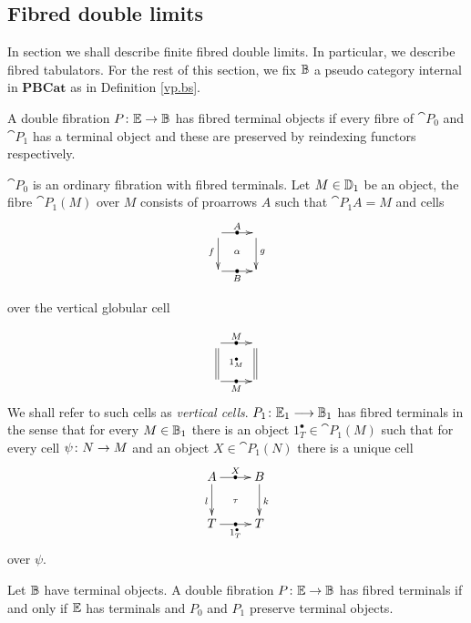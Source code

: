\documentclass[9pt, leqno]{amsart}
\begin{document}
\subsection{Fibred double limits}
In section we shall describe finite fibred double limits. In particular, we describe fibred tabulators. 
For the rest of this section, we fix $\mathbb{B}$ a pseudo category internal in $\mathbf{PBCat}$ as in Definition \ref{vp.bs}. 

\begin{defn}
	A double fibration $P \colon \mathbb{E} \to \mathbb{B}$ has fibred terminal objects if every fibre of $\cat{P}_0$ and $\cat{P}_1$ has a terminal object and these are preserved by reindexing functors respectively. 
\end{defn}

$\cat{P}_0$ is an ordinary fibration with fibred terminals. Let $M \in \mathbb{D}_1$ be an object, the fibre $\cat{P}_1(M)$ over $M$ consists of proarrows $A$ such that $\cat{P}_1{A} = M$ and cells 
\begin{equation*}
	\xymatrix{
		{} \ar[r]|-{\bullet}^{A} \ar[d]_{f} \ar@{}[dr]|{\alpha} & {} \ar[d]^{g} \\
		{} \ar[r]|-{\bullet}_{B} & {}
	}
\end{equation*}

over the vertical globular cell

\begin{equation*}
	\xymatrix{
		{} \ar[r]|-{\bullet}^M \ar@{=}[d] \ar@{}[dr]|{\ipro{M}} & {} \ar@{=}[d] \\
		{} \ar[r]|-{\bullet}_M & {}
	}
\end{equation*}
We shall refer to such cells as \emph{vertical cells}. ${P}_{1} \colon \mathbb{E}_{1} \longrightarrow \mathbb{B}_{1}$ has fibred terminals in the sense that for every $M \in \mathbb{B}_1$ there is an object $1^{\bullet}_T \in \cat{P}_1(M)$ such that for every cell $\psi \colon N \to M$ and an object $X \in \cat{P}_1(N)$ there is a unique cell
\begin{equation*}
	\xymatrix{
		A \ar[r]|-{\bullet}^{X} \ar[d]_{l} \ar@{}[dr]|{\tau} & B \ar[d]^{k} \\
		T \ar[r]|-{\bullet}_{1^{\bullet}_T} & T
	}
\end{equation*}
over $\psi$.

\begin{lemma}
	Let $\mathbb{B}$ have terminal objects. A double fibration $P \colon \mathbb{E} \to \mathbb{B}$ has fibred terminals if and only if $\mathbb{E}$ has terminals and $P_0$ and $P_1$ preserve terminal objects.
\end{lemma}
\end{document}
